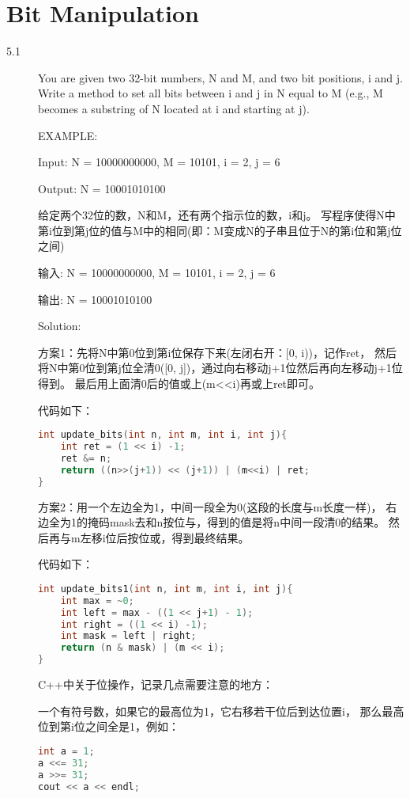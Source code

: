 \chapter{Bit Manipulation}
\small{}

\begin{description}
\item[5.1] You are given two 32-bit numbers, N and M, and two bit positions, i and j. Write a method to set all bits between i and j in N equal to M (e.g., M becomes a substring of N located at i and starting at j).

EXAMPLE:

Input: N = 10000000000, M = 10101, i = 2, j = 6

Output: N = 10001010100

给定两个32位的数，N和M，还有两个指示位的数，i和j。 写程序使得N中第i位到第j位的值与M中的相同(即：M变成N的子串且位于N的第i位和第j位之间)

输入: N = 10000000000, M = 10101, i = 2, j = 6

输出: N = 10001010100

Solution:

方案1：先将N中第0位到第i位保存下来(左闭右开：[0, i))，记作ret， 然后将N中第0位到第j位全清0([0, j])，通过向右移动j+1位然后再向左移动j+1位得到。 最后用上面清0后的值或上(m<<i)再或上ret即可。

代码如下：

\begin{lstlisting}[language=C++]
int update_bits(int n, int m, int i, int j){
    int ret = (1 << i) -1;
    ret &= n;
    return ((n>>(j+1)) << (j+1)) | (m<<i) | ret;
}
\end{lstlisting}

方案2：用一个左边全为1，中间一段全为0(这段的长度与m长度一样)， 右边全为1的掩码mask去和n按位与，得到的值是将n中间一段清0的结果。 然后再与m左移i位后按位或，得到最终结果。

代码如下：

\begin{lstlisting}[language=C++]
int update_bits1(int n, int m, int i, int j){
    int max = ~0;  
    int left = max - ((1 << j+1) - 1);
    int right = ((1 << i) -1);
    int mask = left | right;
    return (n & mask) | (m << i);
}
\end{lstlisting}

C++中关于位操作，记录几点需要注意的地方：

一个有符号数，如果它的最高位为1，它右移若干位后到达位置i， 那么最高位到第i位之间全是1，例如：
\begin{lstlisting}[language=C++]
int a = 1;
a <<= 31;   
a >>= 31;   
cout << a << endl;
\end{lstlisting}


\end{description}
